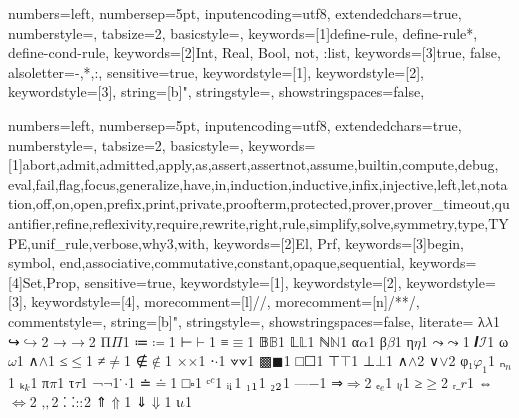 {
  numbers=left,
  numbersep=5pt,
  inputencoding=utf8,
  extendedchars=true,
  numberstyle=\footnotesize,
  tabsize=2,
  basicstyle={\ttfamily\scriptsize\upshape},
  keywords=[1]{define-rule, define-rule*, define-cond-rule},
  keywords=[2]{Int, Real, Bool, not, :list},
  keywords=[3]{true, false},
  alsoletter={-,*,:},
  sensitive=true,
  keywordstyle={[1]\color{mylpurple}},
  keywordstyle={[2]\color{RoyalBlue}},
  keywordstyle={[3]\color{mypurple}},
  string=[b]{"},
  stringstyle=\color{RedOrange},
  showstringspaces=false,
}

\newcommand{\sub}[1]{\ensuremath{_{\!#1}}}


{
  numbers=left,
  numbersep=5pt,
  inputencoding=utf8,
  extendedchars=true,
  numberstyle=\footnotesize,
  tabsize=2,
  basicstyle={\ttfamily\scriptsize\upshape},
  keywords=[1]{abort,admit,admitted,apply,as,assert,assertnot,assume,builtin,compute,debug, eval,fail,flag,focus,generalize,have,in,induction,inductive,infix,injective,left,let,notation,off,on,open,prefix,print,private,proofterm,protected,prover,prover_timeout,quantifier,refine,reflexivity,require,rewrite,right,rule,simplify,solve,symmetry,type,TYPE,unif_rule,verbose,why3,with},
  keywords=[2]{El, Prf},
  keywords=[3]{begin, symbol, end,associative,commutative,constant,opaque,sequential},
  keywords=[4]{Set,Prop},
  sensitive=true,
  keywordstyle={[1]\bfseries\color{purple}},
  keywordstyle={[2]\bfseries\color{purple}},
  keywordstyle={[3]\bfseries\color{violet}},
  keywordstyle={[4]\bfseries\color{blue}},
  morecomment=[l]{//},
  morecomment=[n]{/*}{*/},
  commentstyle={\itshape\color{teal}},
  string=[b]{"},
  stringstyle=\color{RedOrange},
  showstringspaces=false,
  literate=
  {λ}{$\lambda$}1
  {↪}{$\hookrightarrow$}2
  {→}{$\rightarrow$}2
  {Π}{$\Pi$}1
  {≔}{$\coloneqq$}1
  {⊢}{$\vdash$}1
  {≡}{$\equiv$}1
  {𝔹}{$\mathbb{B}$}1
  {𝕃}{$\mathbb{L}$}1
  {ℕ}{$\mathbb{N}$}1
  {α}{$\alpha$}1
  {β}{$\beta$}1
  {η}{$\eta$}1
  {⤳}{$\rightcurvedarrow$}1
  {𝑰}{$\mathcal{I}$}1
  {ω}{$\omega$}1
  {∧}{$\wedge$}1
  {≤}{$\le$}1
  {≠}{$\neq$}1
  {∉}{$\notin$}1
  {×}{$\times$}1
  {⋅}{$\cdot$}1
  {⟇}{$\veedot$}1
  {▩}{$\blacksquare$}1
  {□}{$\Square$}1
  {⊤}{$\top$}1
  {⊥}{$\bot$}1
  {∧}{$\land$}2
  {∨}{$\lor$}2
  {φ₁}{$\varphi_1$}1
  {ₙ}{$_n$}1
  {ₖ}{$_k$}1
  {π}{$\pi$}1
  {τ}{$\tau$}1
  {¬}{$\neg$}1
  { ̇}{$\cdot$}1
  {≐}{$\doteq$}1
  {□}{$\square$}1
  {ᶜ}{${^c}$}1
  {ᵢ}{$\textsubscript{i}$}1
  {₁}{$\textsubscript{1}$}1
  {₂}{$\textsubscript{2}$}1
  {—}{$-$}1
  {⇒}{$\Rightarrow$}2
  {ₑ}{${_e}$}1
  {ₗ}{${_l}$}1
  {≥}{$\geq$}2
  {ᵣ}{$\_r$}1
  {⇔}{$\Leftrightarrow$}2
  {‚}{$,$}2
  {⸬}{$\mathbin{::}$}2
  {⇑}{$\Uparrow$}1
  {⇓}{$\Downarrow$}1
  {ι}{$\iota$}1
}


\newcommand\smtinline[1]{\lstinline[language=SMT,basicstyle=\ttfamily\normalsize]|#1|}
\newcommand\rareinline[1]{\lstinline[language=RARE,basicstyle=\ttfamily\normalsize]|#1|}
\newcommand\lpinline[1]{\lstinline[language=Lambdapi,basicstyle=\ttfamily\normalsize]|#1|}